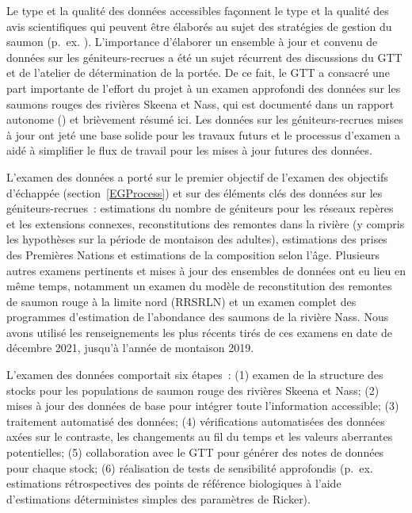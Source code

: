 \documentclass[french,11pt]{book}
\begin{document}
Le type et la qualité des données accessibles façonnent le type et la qualité des avis scientifiques qui peuvent être élaborés au sujet des stratégies de gestion du saumon (p.~ex. ). L'importance d'élaborer un ensemble à jour et convenu de données sur les géniteurs-recrues a été un sujet récurrent des discussions du GTT et de l'atelier de détermination de la portée. De ce fait, le GTT a consacré une part importante de l'effort du projet à un examen approfondi des données sur les saumons rouges des rivières Skeena et Nass, qui est documenté dans un rapport autonome () et brièvement résumé ici. Les données sur les géniteurs-recrues mises à jour ont jeté une base solide pour les travaux futurs et le processus d'examen a aidé à simplifier le flux de travail pour les mises à jour futures des données.

L'examen des données a porté sur le premier objectif de l'examen des objectifs d'échappée (section~\ref{EGProcess}) et sur des éléments clés des données sur les géniteurs-recrues~: estimations du nombre de géniteurs pour les réseaux repères et les extensions connexes, reconstitutions des remontes dans la rivière (y compris les hypothèses sur la période de montaison des adultes), estimations des prises des Premières Nations et estimations de la composition selon l'âge. Plusieurs autres examens pertinents et mises à jour des ensembles de données ont eu lieu en même temps, notamment un examen du modèle de reconstitution des remontes de saumon rouge à la limite nord (RRSRLN) et un examen complet des programmes d'estimation de l'abondance des saumons de la rivière Nass. Nous avons utilisé les renseignements les plus récents tirés de ces examens en date de décembre 2021, jusqu'à l'année de montaison 2019.

L'examen des données comportait six étapes~: (1) examen de la structure des stocks pour les populations de saumon rouge des rivières Skeena et Nass; (2) mises à jour des données de base pour intégrer toute l'information accessible; (3) traitement automatisé des données; (4) vérifications automatisées des données axées sur le contraste, les changements au fil du temps et les valeurs aberrantes potentielles; (5) collaboration avec le GTT pour générer des notes de données pour chaque stock; (6) réalisation de tests de sensibilité approfondis (p.~ex. estimations rétrospectives des points de référence biologiques à l'aide d'estimations déterministes simples des paramètres de Ricker).
\end{document}
